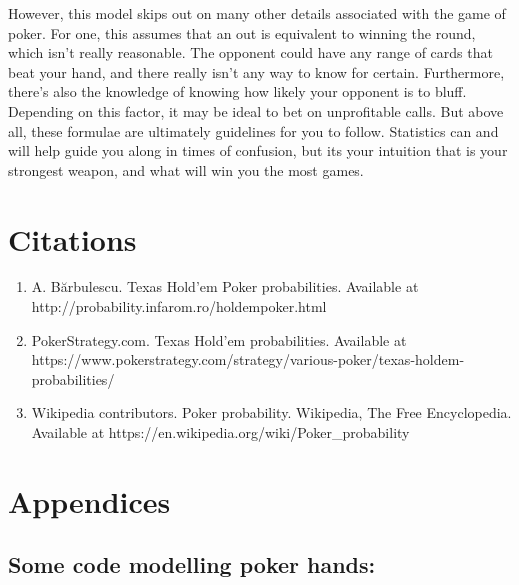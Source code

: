 \documentclass{article}
\begin{document}
However, this model skips out on many other details associated with the game of poker. For one, this assumes that an out is equivalent to winning the round, which isn't really reasonable. The opponent could have any range of cards that beat your hand, and there really isn't any way to know for certain. Furthermore, there's also the knowledge of knowing how likely your opponent is to bluff. Depending on this factor, it may be ideal to bet on unprofitable calls. But above all, these formulae are ultimately guidelines for you to follow. Statistics can and will help guide you along in times of confusion, but its your intuition that is your strongest weapon, and what will win you the most games.



\newpage
\section*{Citations}

\begin{enumerate}[[1]]
    \item A. Bărbulescu. Texas Hold'em Poker probabilities. Available at http://probability.infarom.ro/holdempoker.html
    \item PokerStrategy.com. Texas Hold'em probabilities. Available at https://www.pokerstrategy.com/strategy/various-poker/texas-holdem-probabilities/
    \item Wikipedia contributors. Poker probability. Wikipedia, The Free Encyclopedia. Available at https://en.wikipedia.org/wiki/Poker_probability
\end{enumerate}




\newpage
\section*{Appendices}

\subsection*{Some code modelling poker hands:}
\end{document}
